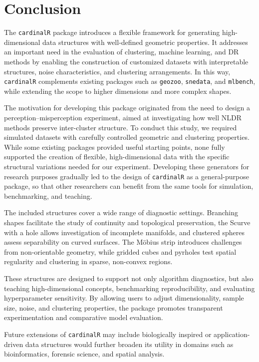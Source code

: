 \documentclass[
  11pt,
  a4paper,
]{report}
\begin{document}
\section{Conclusion}\label{conclusion}

The \texttt{cardinalR} package introduces a flexible framework for
generating high-dimensional data structures with well-defined geometric
properties. It addresses an important need in the evaluation of
clustering, machine learning, and DR methods by enabling the
construction of customized datasets with interpretable structures, noise
characteristics, and clustering arrangements. In this way,
\texttt{cardinalR} complements existing packages such as
\texttt{geozoo}, \texttt{snedata}, and \texttt{mlbench}, while extending
the scope to higher dimensions and more complex shapes.

The motivation for developing this package originated from the need to
design a perception--misperception experiment, aimed at investigating
how well NLDR methods preserve inter-cluster structure. To conduct this
study, we required simulated datasets with carefully controlled
geometric and clustering properties. While some existing packages
provided useful starting points, none fully supported the creation of
flexible, high-dimensional data with the specific structural variations
needed for our experiment. Developing these generators for research
purposes gradually led to the design of \texttt{cardinalR} as a
general-purpose package, so that other researchers can benefit from the
same tools for simulation, benchmarking, and teaching.

The included structures cover a wide range of diagnostic settings.
Branching shapes facilitate the study of continuity and topological
preservation, the Scurve with a hole allows investigation of incomplete
manifolds, and clustered spheres assess separability on curved surfaces.
The Möbius strip introduces challenges from non-orientable geometry,
while gridded cubes and pyrholes test spatial regularity and clustering
in sparse, non-convex regions.

These structures are designed to support not only algorithm diagnostics,
but also teaching high-dimensional concepts, benchmarking
reproducibility, and evaluating hyperparameter sensitivity. By allowing
users to adjust dimensionality, sample size, noise, and clustering
properties, the package promotes transparent experimentation and
comparative model evaluation.

Future extensions of \texttt{cardinalR} may include biologically
inspired or application-driven data structures would further broaden its
utility in domains such as bioinformatics, forensic science, and spatial
analysis.
\end{document}
